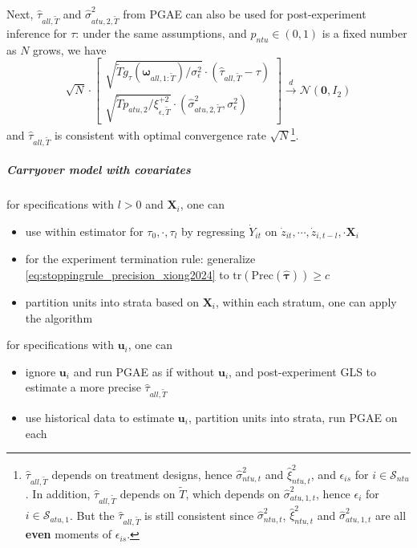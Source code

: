 \documentclass[twoside]{article}
\begin{document}
Next, $\hat{\tau}_{all,\tilde{T}}$ and $\hat{\sigma}^2_{atu,2,\tilde{T}}$ from PGAE can also be used for post-experiment inference for $\tau$: under the same assumptions, and $p_{ntu}\in (0,1)$ is a fixed number as $N$ grows, we have 
$$
\sqrt{N} \cdot \begin{bmatrix}
    \sqrt{ \tilde{T}g_{\tau}\left(\boldsymbol{\omega}_{all,1:\tilde{T}}\right)/\sigma^2_{\epsilon} }\cdot \left(\hat{\tau}_{all,\tilde{T}} - \tau\right) \\
    \sqrt{\tilde{T} p_{atu,2}/\xi^{+2}_{\epsilon,\tilde{T}}} \cdot \left(\hat{\sigma}^2_{atu,2,\tilde{T}},\sigma^2_{\epsilon}\right) 
\end{bmatrix} \xrightarrow{d} \mathcal{N}\left(\mathbf{0},I_2\right)
$$
and $\hat{\tau}_{all,\tilde{T}}$ is consistent with optimal convergence rate $\sqrt{N}$\footnote{$\hat{\tau}_{all,\tilde{T}}$ depends on treatment designs, hence $\hat{\sigma}^2_{ntu,t}$ and $\hat{\xi}^2_{ntu,t}$, and $\epsilon_{is}$ for $i\in\mathcal{S}_{ntu}$. In addition, $\hat{\tau}_{all,\tilde{T}}$ depends on $\tilde{T}$, which depends on $\hat{\sigma}^2_{atu,1,t}$, hence $\epsilon_i$ for $i\in \mathcal{S}_{atu,1}$. But the $\hat{\tau}_{all,\tilde{T}}$ is still consistent since $\hat{\sigma}^2_{ntu,t}$, $\hat{\xi}^2_{ntu,t}$ and $\hat{\sigma}^2_{atu,1,t}$ are all \textbf{even} moments of $\epsilon_{is}$.}.

\subparagraph*{Carryover model with covariates} for specifications with $l>0$ and $\mathbf{X}_i$, one can 
\begin{itemize}
    \item use within estimator for $\tau_0,\cdot,\tau_l$ by regressing $\dot{Y}_{it}$ on $\dot{z}_{it},\cdots,\dot{z}_{i,t-l},\cdot{\mathbf{X}}_i$ 
    \item for the experiment termination rule: generalize \ref{eq:stoppingrule_precision_xiong2024} to $\mathrm{tr}\left(\mathrm{Prec}\left(\hat{\boldsymbol{\tau}}\right)\right) \geq c$
    \item partition units into strata based on $\mathbf{X}_i$, within each stratum, one can apply the algorithm 
\end{itemize}

for specifications with $\mathbf{u}_i$, one can 
\begin{itemize}
    \item ignore $\mathbf{u}_i$ and run PGAE as if without $\mathbf{u}_i$, and post-experiment GLS to estimate a more precise $\hat{\tau}_{all,\tilde{T}}$
    \item use historical data to estimate $\mathbf{u}_i$, partition units into strata, run PGAE on each
\end{itemize}
\end{document}
